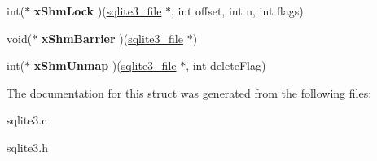 \begin{DoxyCompactItemize}
\item 
\hypertarget{structsqlite3__io__methods_a58f4a6b0df86440029cc5fa1b65b1b4e}{int($\ast$ {\bfseries x\-Shm\-Lock} )(\hyperlink{structsqlite3__file}{sqlite3\-\_\-file} $\ast$, int offset, int n, int flags)}\label{structsqlite3__io__methods_a58f4a6b0df86440029cc5fa1b65b1b4e}

\item 
\hypertarget{structsqlite3__io__methods_aedf4a59fa25ad33e0625a2aa0f6f2184}{void($\ast$ {\bfseries x\-Shm\-Barrier} )(\hyperlink{structsqlite3__file}{sqlite3\-\_\-file} $\ast$)}\label{structsqlite3__io__methods_aedf4a59fa25ad33e0625a2aa0f6f2184}

\item 
\hypertarget{structsqlite3__io__methods_af69cbc7ece1854576ac262f986871563}{int($\ast$ {\bfseries x\-Shm\-Unmap} )(\hyperlink{structsqlite3__file}{sqlite3\-\_\-file} $\ast$, int delete\-Flag)}\label{structsqlite3__io__methods_af69cbc7ece1854576ac262f986871563}

\end{DoxyCompactItemize}


The documentation for this struct was generated from the following files\-:\begin{DoxyCompactItemize}
\item 
sqlite3.\-c\item 
sqlite3.\-h\end{DoxyCompactItemize}
